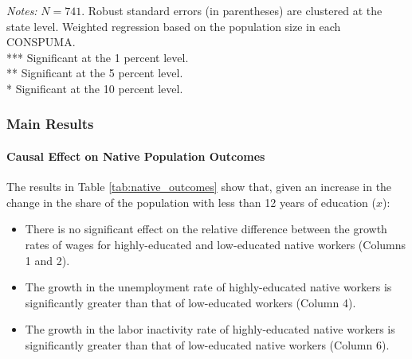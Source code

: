 \begin{frame}
\begin{table}[ht]
            \begin{minipage}{\linewidth}
                \tiny
                \textit{Notes:} $N = 741$. Robust standard errors (in parentheses) are clustered at the state level. Weighted regression based on the population size in each CONSPUMA.\\
                *** Significant at the 1 percent level. \\
                ** Significant at the 5 percent level. \\
                * Significant at the 10 percent level.
            \end{minipage}
    \end{table}
    

\end{frame}

\begin{frame}
    \frametitle{Main Results}
    \framesubtitle{Causal Effect on Native Population Outcomes}

    The results in Table \ref{tab:native_outcomes} show that, given an increase in the change in the share of the population with less than 12 years of education ($x$):

    \begin{itemize}
    \item There is no significant effect on the relative difference between the growth rates of wages for highly-educated and low-educated native workers (Columns 1 and 2).
    \item The growth in the unemployment rate of highly-educated native workers is significantly greater than that of low-educated workers (Column 4).
    \item The growth in the labor inactivity rate of highly-educated native workers is significantly greater than that of low-educated native workers (Column 6).
    \end{itemize}
\end{frame}

